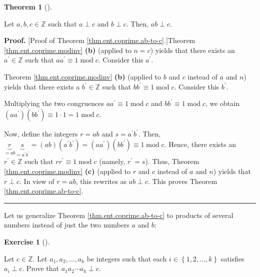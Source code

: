 \documentclass[numbers=enddot,12pt,final,onecolumn,notitlepage]{scrartcl}%
\newcounter{exer}
\numberwithin{exer}{subsection}
\theoremstyle{definition}
\newtheorem{theo}{Theorem}[subsection]
\newenvironment{theorem}[1][]
{\begin{theo}[#1]\begin{leftbar}}
{\end{leftbar}\end{theo}}
\newtheorem{exmp}[exer]{Exercise}
\newenvironment{exercise}[1][]
{\begin{exmp}[#1]\begin{leftbar}}
{\end{leftbar}\end{exmp}}
\newenvironment{proof}[1][Proof]{\noindent\textbf{#1.} }{\ \rule{0.5em}{0.5em}}
\begin{document}
\begin{theorem}
\label{thm.ent.coprime.ab-to-c}Let $a,b,c\in\mathbb{Z}$ such that $a\perp c$
and $b\perp c$. Then, $ab\perp c$.
\end{theorem}

\begin{proof}
[Proof of Theorem \ref{thm.ent.coprime.ab-to-c}.]Theorem
\ref{thm.ent.coprime.modinv} \textbf{(b)} (applied to $n=c$) yields that there
exists an $a^{\prime}\in\mathbb{Z}$ such that $aa^{\prime}\equiv
1\operatorname{mod}c$. Consider this $a^{\prime}$.

Theorem \ref{thm.ent.coprime.modinv} \textbf{(b)} (applied to $b$ and $c$
instead of $a$ and $n$) yields that there exists a $b^{\prime}\in\mathbb{Z}$
such that $bb^{\prime}\equiv1\operatorname{mod}c$. Consider this $b^{\prime}$.

Multiplying the two congruences $aa^{\prime}\equiv1\operatorname{mod}c$ and
$bb^{\prime}\equiv1\operatorname{mod}c$, we obtain $\left(  aa^{\prime
}\right)  \left(  bb^{\prime}\right)  \equiv1\cdot1=1\operatorname{mod}c$.

Now, define the integers $r=ab$ and $s=a^{\prime}b^{\prime}$. Then,
$\underbrace{r}_{=ab}\underbrace{s}_{=a^{\prime}b^{\prime}}=\left(  ab\right)
\left(  a^{\prime}b^{\prime}\right)  =\left(  aa^{\prime}\right)  \left(
bb^{\prime}\right)  \equiv1\operatorname{mod}c$. Hence, there exists an
$r^{\prime}\in\mathbb{Z}$ such that $rr^{\prime}\equiv1\operatorname{mod}c$
(namely, $r^{\prime}=s$). Thus, Theorem \ref{thm.ent.coprime.modinv}
\textbf{(c)} (applied to $r$ and $c$ instead of $a$ and $n$) yields that
$r\perp c$. In view of $r=ab$, this rewrites as $ab\perp c$. This proves
Theorem \ref{thm.ent.coprime.ab-to-c}.
\end{proof}

Let us generalize Theorem \ref{thm.ent.coprime.ab-to-c} to products of several
numbers instead of just the two numbers $a$ and $b$:

\begin{exercise}
\label{exe.ent.coprime.ab-to-ck}Let $c\in\mathbb{Z}$. Let $a_{1},a_{2}%
,\ldots,a_{k}$ be integers such that each $i\in\left\{  1,2,\ldots,k\right\}
$ satisfies $a_{i}\perp c$. Prove that $a_{1}a_{2}\cdots a_{k}\perp c$.
\end{exercise}
\end{document}
